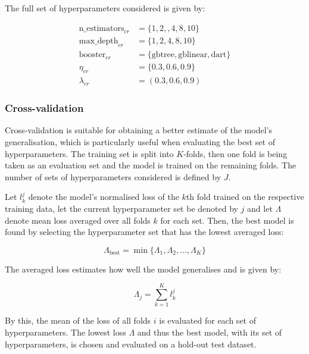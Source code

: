 \documentclass[11pt]{scrartcl}
\begin{document}
The full set of hyperparameters considered is given by:

\begin{equation}
	\begin{split}
		\text{n\_estimators}_{cr} & = \{1, 2,, 4, 8, 10\} \\
		\text{max\_depth}_{cr} & = \{1, 2, 4, 8, 10\} \\
		\text{booster}_{cr} & = \{\text{gbtree}, \text{gblinear}, \text{dart}\} \\
		\eta_{cr} & = \{0.3, 0.6, 0.9\} \\
		\lambda_{cr} & = (0.3, 0.6, 0.9)
	\end{split}
\end{equation}

\subsubsection{Cross-validation}

Cross-validation is suitable for obtaining a better estimate of the model's generalisation, which is particularly useful when evaluating the best set of hyperparameters. The training set is split into $K$-folds, then one fold is being taken as an evaluation set and the model is trained on the remaining folds. The number of sets of hyperparameters considered is defined by $J$.

Let $l_k^j$ denote the model's normalised loss of the $k$th fold trained on the respective training data, let the current hyperparameter set be denoted by $j$ and let $\Lambda$ denote mean loss averaged over all folds $k$ for each set. Then, the best model is found by selecting the hyperparameter set that has the lowest averaged loss:

\begin{equation}
	\Lambda_{\text{best}} = \min \{\Lambda_1, \Lambda_2, ..., \Lambda_K \}
\end{equation}

The averaged loss estimates how well the model generalises and is given by:

\begin{equation}
	\Lambda_j = \sum_{k=1}^K l_k^j
\end{equation}

By this, the mean of the loss of all folds $i$ is evaluated for each set of hyperparameters. The lowest loss $\Lambda$ and thus the best model, with its set of hyperparameters, is chosen and evaluated on a hold-out test dataset.
\end{document}
